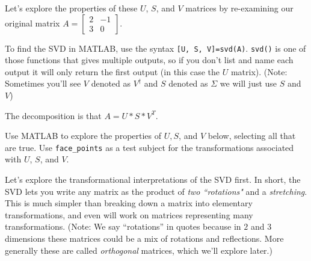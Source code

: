 \documentclass{ximera}
\begin{document}
Let's explore the properties of these $U$, $S$, and $V$ matrices by re-examining our original matrix $A=\begin{bmatrix} 2 & -1 \\ 3 & 0\end{bmatrix}$.

To find the SVD in MATLAB, use the syntax \texttt{[U, S, V]=svd(A)}. \texttt{svd()} is one of those functions that gives multiple outputs, so if you don't list and name each output it will only return the first output (in this case the $U$ matrix). (Note: Sometimes you'll see $V$ denoted as $V^\dagger$ and $S$ denoted as $\Sigma$ we will just use $S$ and $V$)

The decomposition is that $A=U*S*V^{T}$. 

\begin{problem}
Use MATLAB to explore the properties of $U, S$, and $V$ below, selecting all that are true. Use \texttt{face\_points} as a test subject for the transformations associated with $U$, $S$, and $V$.

\begin{selectAll}


\end{selectAll}

\begin{feedback}

  Let's explore the transformational interpretations of the SVD first. In short, the SVD lets you write any matrix as the product of \emph{two ``rotations"} and a \emph{stretching}. This is much simpler than breaking down a matrix into elementary transformations, and even will work on matrices representing many transformations. (Note: We say ``rotations'' in quotes because in $2$ and $3$ dimensions these matrices could be a mix of rotations and reflections. More generally these are called \emph{orthogonal} matrices, which we'll explore later.)


\end{feedback}
\end{problem}
\end{document}
